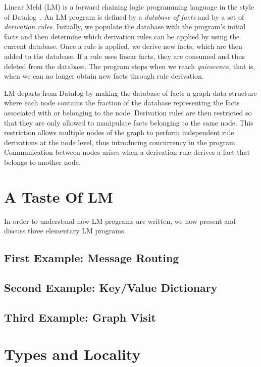 
Linear Meld (LM) is a forward chaining logic programming language in the style
of Datalog~\cite{Ullman:1990:PDK:533142}. An LM program is defined by a
\emph{database of facts} and by a set of \emph{derivation rules}.  Initially, we
populate the database with the program's initial facts and then determine which
derivation rules can be applied by using the current database. Once a rule is
applied, we derive new facts, which are then added to the database.  If a rule
uses linear facts, they are consumed and thus deleted from the database.  The
program stops when we reach \emph{quiescence}, that is, when we can no longer
obtain new facts through rule derivation.

LM departs from Datalog by making the database of facts a graph data structure
where each node contains the fraction of the database representing the facts
associated with or belonging to the node. Derivation rules are then restricted
so that they are only allowed to manipulate facts belonging to the same node.
This restriction allows multiple nodes of the graph to perform independent rule
derivations at the node level, thus introducing concurrency in the program.
Communication between nodes arises when a derivation rule derives a fact that
belongs to another node.

\section{A Taste Of LM}

In order to understand how LM programs are written, we now present and discuss
three elementary LM programs.

\subsection{First Example: Message Routing}\label{section:language:message}


\subsection{Second Example: Key/Value Dictionary}\label{sec:language:key_value}


\subsection{Third Example: Graph Visit}


\section{Types and Locality}

